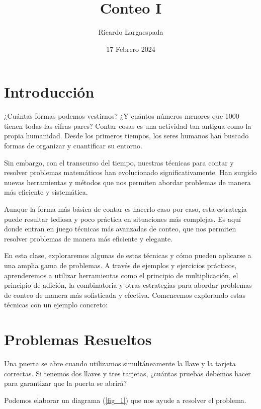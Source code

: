 \documentclass[11pt]{scrartcl}
\begin{document}
\title{Conteo I}
\author{Ricardo Largaespada}
\date{17 Febrero 2024}

\maketitle

\section{Introducción}

¿Cuántas formas podemos vestirnos? ¿Y cuántos números menores que 1000 tienen todas las cifras pares? Contar cosas es una actividad tan antigua como la propia humanidad. Desde los primeros tiempos, los seres humanos han buscado formas de organizar y cuantificar su entorno.

Sin embargo, con el transcurso del tiempo, nuestras técnicas para contar y resolver problemas matemáticos han evolucionado significativamente. Han surgido nuevas herramientas y métodos que nos permiten abordar problemas de manera más eficiente y sistemática.

Aunque la forma más básica de contar es hacerlo caso por caso, esta estrategia puede resultar tediosa y poco práctica en situaciones más complejas. Es aquí donde entran en juego técnicas más avanzadas de conteo, que nos permiten resolver problemas de manera más eficiente y elegante.

En esta clase, exploraremos algunas de estas técnicas y cómo pueden aplicarse a una amplia gama de problemas. A través de ejemplos y ejercicios prácticos, aprenderemos a utilizar herramientas como el principio de multiplicación, el principio de adición, la combinatoria y otras estrategias para abordar problemas de conteo de manera más sofisticada y efectiva. Comencemos explorando estas técnicas con un ejemplo concreto:

\section{Problemas Resueltos}
\begin{example}
Una puerta se abre cuando utilizamos simultáneamente la llave y la tarjeta correctas. Si tenemos dos llaves y tres tarjetas, ¿cuántas pruebas debemos hacer para garantizar que la puerta se abrirá?
\end{example}
Podemos elaborar un diagrama (\ref{fig_1}) que nos ayude a resolver el problema.
\end{document}
